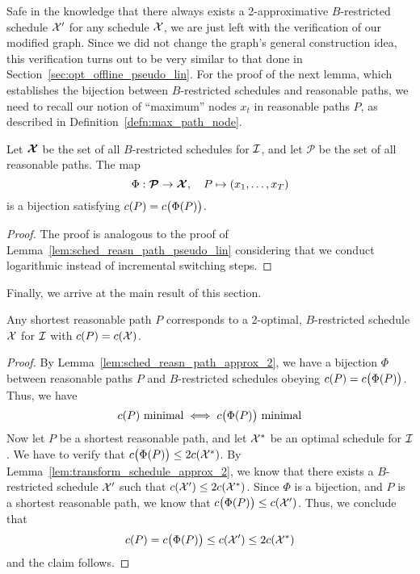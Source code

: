 Safe in the knowledge that there always exists a 2-approximative $B$-restricted schedule $\mathcal{X}'$ for any schedule $\mathcal{X}$, we are just left with the verification of our modified graph. Since we did not change the graph's general construction idea, this verification turns out to be very similar to that done in Section~\ref{sec:opt_offline_pseudo_lin}. For the proof of the next lemma, which establishes the bijection between $B$-restricted schedules and reasonable paths, we need to recall our notion of ``maximum'' nodes $x_t$ in reasonable paths $P$, as described in Definition~\ref{defn:max_path_node}.
\begin{lem}\label{lem:sched_reasn_path_approx_2}
Let $\bm{\mathcal{X}}$ be the set of all $B$-restricted schedules for $\mathcal{I}$, and let $\bm{\mathcal{P}}$ be the set of all reasonable paths. The map
\begin{equation*}
	\Phi:\bm{\mathcal{P}}\rightarrow\bm{\mathcal{X}},\quad P\mapsto (x_1,\dotsc,x_T)
\end{equation*}
is a bijection satisfying $c(P)=c\bigl(\Phi(P)\bigr)$.
\end{lem}
\begin{proof}
The proof is analogous to the proof of Lemma~\ref{lem:sched_reasn_path_pseudo_lin} considering that we conduct logarithmic instead of incremental switching steps.
\end{proof}
Finally, we arrive at the main result of this section.
\begin{thm}\label{thm:approx_2}
Any shortest reasonable path $P$ corresponds to a 2-optimal, $B$-restricted schedule $\mathcal{X}$ for $\mathcal{I}$ with $c(P)=c(\mathcal{X})$.
\end{thm} 
\begin{proof}
By Lemma~\ref{lem:sched_reasn_path_approx_2}, we have a bijection $\Phi$ between reasonable paths $P$ and $B$-restricted schedules obeying $c(P)=c\bigl(\Phi(P)\bigr)$. Thus, we have 
\begin{equation*}
	c(P)\text{ minimal}\iff c\bigl(\Phi(P)\big)\text{ minimal}
\end{equation*}
Now let $P$ be a shortest reasonable path, and let $\mathcal{X}^*$ be an optimal schedule for $\mathcal{I}$. We have to verify that $c\bigl(\Phi(P)\bigr)\le 2c(\mathcal{X}^*)$. By Lemma~\ref{lem:transform_schedule_approx_2}, we know that there exists a $B$-restricted schedule $\mathcal{X}'$ such that $c(\mathcal{X}')\le 2c(\mathcal{X}^*)$. Since $\Phi$ is a bijection, and $P$ is a shortest reasonable path, we know that $c\bigl(\Phi(P)\bigr)\le c(\mathcal{X}')$. Thus, we conclude that 
\begin{equation*}
	c(P)=c\bigl(\Phi(P)\bigr)\le c(\mathcal{X}')\le 2c(\mathcal{X}^*)
\end{equation*}
and the claim follows.
\end{proof}
